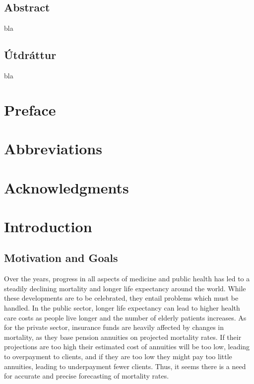 \documentclass[
]{book}
\begin{document}
\setcounter{page}{5}
\section*{\huge Abstract}
bla
\vfill \vspace*{1cm}
\section*{\huge Útdráttur}
bla
\vfill
\newpage

\chapter*{Preface}

\tableofcontents
\listoffigures
\listoftables

\chapter*{Abbreviations}

\chapter*{Acknowledgments}

\clearpage
{}
\setcounter{page}{1}

\hfill\break

\hypertarget{introduction}{%
\chapter{Introduction}\label{introduction}}

\hypertarget{motivation-and-goals}{%
\section{Motivation and Goals}\label{motivation-and-goals}}

Over the years, progress in all aspects of medicine and public health has led to a steadily declining mortality and longer life expectancy around the world. While these developments are to be celebrated, they entail problems which must be handled. In the public sector, longer life expectancy can lead to higher health care costs as people live longer and the number of elderly patients increases. As for the private sector, insurance funds are heavily affected by changes in mortality, as they base pension annuities on projected mortality rates. If their projections are too high their estimated cost of annuities will be too low, leading to overpayment to clients, and if they are too low they might pay too little annuities, leading to underpayment fewer clients. Thus, it seems there is a need for accurate and precise forecasting of mortality rates.
\end{document}
